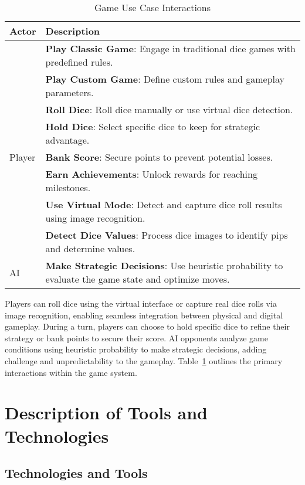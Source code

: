 \begin{table}[ht!]
    \centering
    \caption{Game Use Case Interactions}
    \label{tab:game_usecase}
    \begin{tabular}{|l|p{12cm}|}
        \hline
        \textbf{Actor} & \textbf{Description} \\
        \hline
               & \textbf{Play Classic Game}: Engage in traditional dice games with predefined rules. \\
               & \textbf{Play Custom Game}: Define custom rules and gameplay parameters. \\
               & \textbf{Roll Dice}: Roll dice manually or use virtual dice detection. \\
               & \textbf{Hold Dice}: Select specific dice to keep for strategic advantage. \\
        Player & \textbf{Bank Score}: Secure points to prevent potential losses. \\
               & \textbf{Earn Achievements}: Unlock rewards for reaching milestones. \\
               & \textbf{Use Virtual Mode}: Detect and capture dice roll results using image recognition. \\
               & \textbf{Detect Dice Values}: Process dice images to identify pips and determine values. \\
        \hline
        AI & \textbf{Make Strategic Decisions}: Use heuristic probability to evaluate the game state and optimize moves. \\
        \hline
    \end{tabular}    
\end{table}

Players can roll dice using the virtual interface or capture real dice rolls via image recognition, enabling seamless integration between physical and digital gameplay. During a turn, players can choose to hold specific dice to refine their strategy or bank points to secure their score. AI opponents analyze game conditions using heuristic probability to make strategic decisions, adding challenge and unpredictability to the gameplay. Table~\ref{tab:game_usecase} outlines the primary interactions within the game system.

\section{Description of Tools and Technologies}

\subsection{Technologies and Tools}

